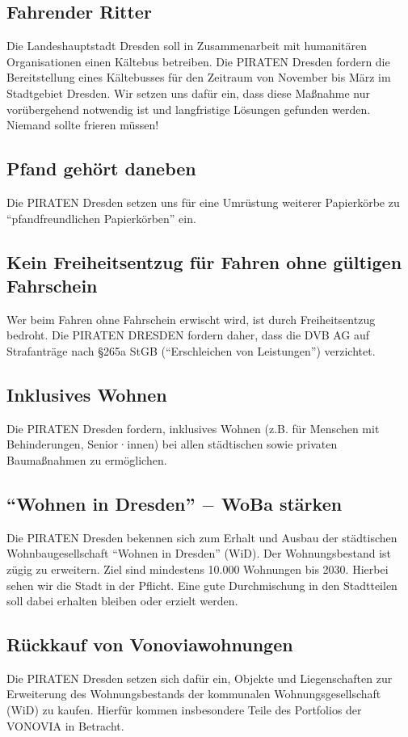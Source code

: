 \documentclass[a4paper, 11pt]{article}
\begin{document}
\subsection{Fahrender Ritter}
Die Landeshauptstadt Dresden soll in Zusammenarbeit mit humanitären Organisationen einen Kältebus betreiben. Die PIRATEN Dresden fordern die Bereitstellung eines Kältebusses für den Zeitraum von November bis März im Stadtgebiet Dresden. Wir setzen uns dafür ein, dass diese Maßnahme nur vorübergehend notwendig ist und langfristige Lösungen gefunden werden. Niemand sollte frieren müssen!



\subsection{Pfand gehört daneben}
Die PIRATEN Dresden setzen uns für eine Umrüstung weiterer Papierkörbe zu ``pfandfreundlichen Papierkörben'' ein.


\subsection{Kein Freiheitsentzug für Fahren ohne gültigen Fahrschein}
Wer beim Fahren ohne Fahrschein erwischt wird, ist durch Freiheitsentzug bedroht. Die PIRATEN DRESDEN fordern daher, dass die DVB AG auf Strafanträge nach §265a StGB (``Erschleichen von Leistungen'') verzichtet.


\subsection{Inklusives Wohnen}
Die PIRATEN Dresden fordern, inklusives Wohnen (z.B. für Menschen mit Behinderungen, Senior·innen) bei allen städtischen sowie privaten Baumaßnahmen zu ermöglichen.


\subsection{``Wohnen in Dresden'' $-$ WoBa stärken}
Die PIRATEN Dresden bekennen sich zum Erhalt und Ausbau der städtischen Wohnbaugesellschaft ``Wohnen in Dresden'' (WiD). Der Wohnungsbestand ist zügig zu erweitern. Ziel sind mindestens 10.000 Wohnungen bis 2030. Hierbei sehen wir die Stadt in der Pflicht. Eine gute Durchmischung in den Stadtteilen soll dabei erhalten bleiben oder erzielt werden.


\subsection{Rückkauf von Vonoviawohnungen}
Die PIRATEN Dresden setzen sich dafür ein, Objekte und Liegenschaften zur Erweiterung des Wohnungsbestands der kommunalen Wohnungsgesellschaft (WiD) zu kaufen. Hierfür kommen insbesondere Teile des Portfolios der VONOVIA in Betracht.
\end{document}
